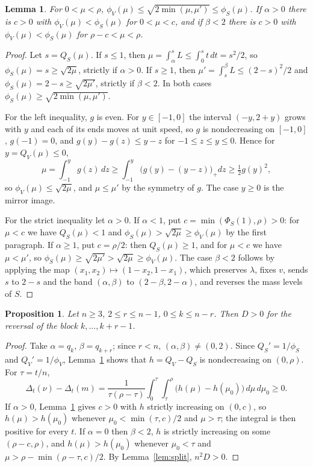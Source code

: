 \documentclass[11pt]{amsart}
\newtheorem{lemma}[theorem]{Lemma}
\newtheorem{proposition}[theorem]{Proposition}
\theoremstyle{definition}
\theoremstyle{remark}
\numberwithin{equation}{section}
\begin{document}
\begin{lemma}\label{lem:disp}
For $0<\mu<\rho$, $\phi_V(\mu)\le\sqrt{2\min(\mu,\mu')}\le\phi_S(\mu)$. If $\alpha>0$ there is $c>0$ with
$\phi_V(\mu)<\phi_S(\mu)$ for $0<\mu<c$, and if $\beta<2$ there is $c>0$ with $\phi_V(\mu)<\phi_S(\mu)$ for $\rho-c<\mu<\rho$.
\end{lemma}

\begin{proof}
Let $s=Q_S(\mu)$. If $s\le1$, then $\mu=\int_\alpha^sL\le\int_0^s t\,dt=s^2/2$, so $\phi_S(\mu)=s\ge\sqrt{2\mu}$, strictly
if $\alpha>0$. If $s\ge1$, then $\mu'=\int_s^\beta L\le(2-s)^2/2$ and $\phi_S(\mu)=2-s\ge\sqrt{2\mu'}$, strictly if
$\beta<2$. In both cases $\phi_S(\mu)\ge\sqrt{2\min(\mu,\mu')}$.

For the left inequality, $g$ is even. For $y\in[-1,0]$ the interval $(-y,2+y)$ grows with $y$ and each of its ends
moves at unit speed, so $g$ is nondecreasing on $[-1,0]$, $g(-1)=0$, and $g(y)-g(z)\le y-z$ for $-1\le z\le y\le0$. Hence
for $y=Q_V(\mu)\le0$,
\[
\mu=\int_{-1}^yg(z)\,dz\ge\int_{-1}^y\bigl(g(y)-(y-z)\bigr)_+dz\ge\tfrac12g(y)^2,
\]
so $\phi_V(\mu)\le\sqrt{2\mu}$, and $\mu\le\mu'$ by the symmetry of $g$. The case $y\ge0$ is the mirror image.

For the strict inequality let $\alpha>0$. If $\alpha<1$, put $c=\min(\Phi_S(1),\rho)>0$: for $\mu<c$ we have $Q_S(\mu)<1$
and $\phi_S(\mu)>\sqrt{2\mu}\ge\phi_V(\mu)$ by the first paragraph. If $\alpha\ge1$, put $c=\rho/2$: then $Q_S(\mu)\ge1$, and
for $\mu<c$ we have $\mu<\mu'$, so $\phi_S(\mu)\ge\sqrt{2\mu'}>\sqrt{2\mu}\ge\phi_V(\mu)$. The case $\beta<2$ follows by
applying the map $(x_1,x_2)\mapsto(1-x_2,1-x_1)$, which preserves $\lambda$, fixes $v$, sends $s$ to $2-s$ and the band
$(\alpha,\beta)$ to $(2-\beta,2-\alpha)$, and reverses the mass levels of $S$.
\end{proof}

\begin{proposition}\label{prop:block}
Let $n\ge3$, $2\le r\le n-1$, $0\le k\le n-r$. Then $D>0$ for the reversal of the block $k,\dots,k+r-1$.
\end{proposition}

\begin{proof}
Take $\alpha=q_k$, $\beta=q_{k+r}$; since $r<n$, $(\alpha,\beta)\ne(0,2)$. Since $Q_S'=1/\phi_S$ and
$Q_V'=1/\phi_V$, Lemma~\ref{lem:disp} shows that $h=Q_V-Q_S$ is nondecreasing on $(0,\rho)$. For $\tau=t/n$,
\[
\Delta_t(\nu)-\Delta_t(m)=\frac1{\tau(\rho-\tau)}\int_0^\tau\!\!\int_\tau^\rho\bigl(h(\mu)-h(\mu_0)\bigr)\,d\mu\,d\mu_0\ge0.
\]
If $\alpha>0$, Lemma~\ref{lem:disp} gives $c>0$ with $h$ strictly increasing on $(0,c)$, so $h(\mu)>h(\mu_0)$ whenever
$\mu_0<\min(\tau,c)/2$ and $\mu>\tau$; the integral is then positive for every $t$. If $\alpha=0$ then $\beta<2$, $h$ is
strictly increasing on some $(\rho-c,\rho)$, and $h(\mu)>h(\mu_0)$ whenever $\mu_0<\tau$ and
$\mu>\rho-\min(\rho-\tau,c)/2$. By Lemma~\ref{lem:split}, $n^2D>0$.
\end{proof}
\end{document}
